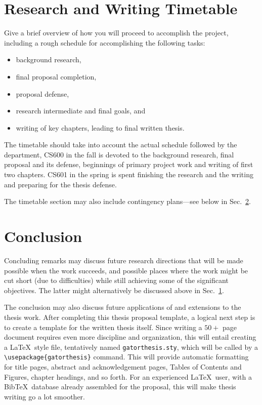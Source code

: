 \documentclass[11pt]{article}
\begin{document}
\section{Research and Writing Timetable}\label{sec:timetable}

Give a brief overview of how you will proceed to accomplish the project,
including a rough schedule for accomplishing the following tasks:
\begin{itemize}
\item background research,
\item final proposal completion,
\item proposal defense,
\item research intermediate and final goals, and
\item writing of key chapters, leading to final written thesis.
\end{itemize}
The timetable should take into account the actual schedule followed by
the department, CS600 in the fall is devoted to the background research,
final proposal and its defense, beginnings of primary project work and
writing of first two chapters.  CS601 in the spring is spent finishing
the research and the writing and preparing for the thesis defense.

The timetable section may also include contingency plans---see below in
Sec.~\ref{sec:conclusion}.

\section{Conclusion}\label{sec:conclusion}

Concluding remarks may discuss future research directions that will
be made possible when the work succeeds, and possible places where
the work might be cut short (due to difficulties) while still achieving
some of the significant objectives.  The latter might alternatively
be discussed above in Sec.~\ref{sec:timetable}.

The conclusion may also discuss future applications of and extensions
to the thesis work.  After completing this thesis proposal template,
a logical next step is to create a template for the written thesis itself.
Since writing a $50+$ page document requires even more discipline and
organization, this will entail creating a \LaTeX\ style file, tentatively
named \verb+gatorthesis.sty+, which will be called by a
\verb+\usepackage{gatorthesis}+ command.  This will provide automatic
formatting for title pages, abstract and acknowledgement pages, Tables
of Contents and Figures, chapter headings, and so forth.  For
an experienced \LaTeX\ user, with a Bib\TeX\ database already assembled
for the proposal, this will make thesis writing go a lot smoother.
\end{document}
